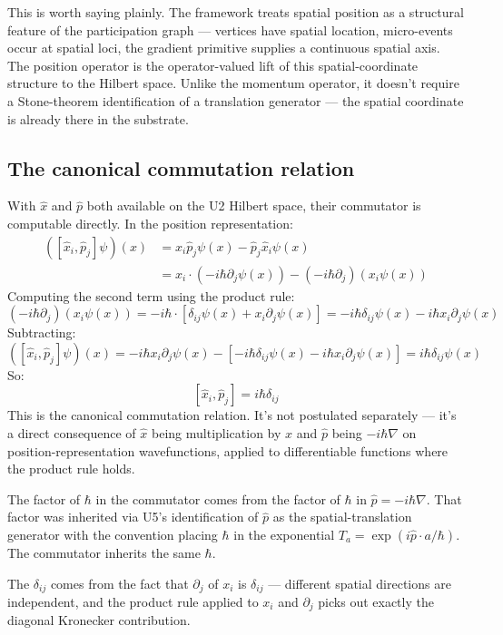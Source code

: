 \documentclass[11pt,a4paper]{article}
\begin{document}
This is worth saying plainly. The framework treats spatial position as a structural feature of the participation graph --- vertices have spatial location, micro-events occur at spatial loci, the gradient primitive supplies a continuous spatial axis. The position operator is the operator-valued lift of this spatial-coordinate structure to the Hilbert space. Unlike the momentum operator, it doesn't require a Stone-theorem identification of a translation generator --- the spatial coordinate is already there in the substrate.

\subsection{The canonical commutation relation}

With $\hat{x}$ and $\hat{p}$ both available on the U2 Hilbert space, their commutator is computable directly. In the position representation:
\begin{align*}
([\hat{x}_i, \hat{p}_j] \psi)(x) &= \hat{x}_i \hat{p}_j \psi(x) - \hat{p}_j \hat{x}_i \psi(x) \\
&= x_i \cdot (-i\hbar\partial_j \psi(x)) - (-i\hbar\partial_j)(x_i \psi(x))
\end{align*}
Computing the second term using the product rule:
\[
(-i\hbar\partial_j)(x_i \psi(x)) = -i\hbar \cdot [\delta_{ij}\psi(x) + x_i\partial_j\psi(x)] = -i\hbar\delta_{ij}\psi(x) - i\hbar x_i\partial_j\psi(x)
\]
Subtracting:
\[
([\hat{x}_i, \hat{p}_j]\psi)(x) = -i\hbar x_i\partial_j\psi(x) - [-i\hbar\delta_{ij}\psi(x) - i\hbar x_i\partial_j\psi(x)] = i\hbar\delta_{ij}\psi(x)
\]
So:
\[
[\hat{x}_i, \hat{p}_j] = i\hbar\delta_{ij}
\]
This is the canonical commutation relation. It's not postulated separately --- it's a direct consequence of $\hat{x}$ being multiplication by $x$ and $\hat{p}$ being $-i\hbar\nabla$ on position-representation wavefunctions, applied to differentiable functions where the product rule holds.

The factor of $\hbar$ in the commutator comes from the factor of $\hbar$ in $\hat{p} = -i\hbar\nabla$. That factor was inherited via U5's identification of $\hat{p}$ as the spatial-translation generator with the convention placing $\hbar$ in the exponential $T_a = \exp(i\hat{p}\cdot a/\hbar)$. The commutator inherits the same $\hbar$.

The $\delta_{ij}$ comes from the fact that $\partial_j$ of $x_i$ is $\delta_{ij}$ --- different spatial directions are independent, and the product rule applied to $x_i$ and $\partial_j$ picks out exactly the diagonal Kronecker contribution.
\end{document}

